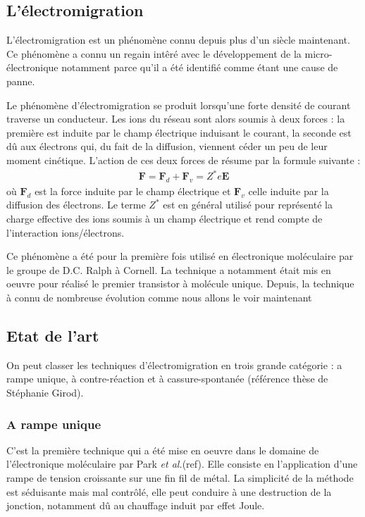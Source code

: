 \subsection{L'électromigration}
L'électromigration est un phénomène connu depuis plus d'un siècle maintenant. Ce phénomène a connu un regain int\^eré avec le développement de la micro-électronique notamment parce qu'il a été identifié comme étant une cause de panne.

Le phénomène d'électromigration se produit lorsqu'une forte densité de courant traverse un conducteur. Les ions du réseau sont alors soumis à deux forces : la première est induite par le champ électrique induisant le courant, la seconde est d\^u aux électrons qui, du fait de la diffusion, viennent céder un peu de leur moment cinétique. L'action de ces deux forces de résume par la formule suivante :
\begin{eqnarray}
\textbf{F} = \textbf{F}_d + \textbf{F}_v = Z^*e\textbf{E} \nonumber
\end{eqnarray}
où $\textbf{F}_d$ est la force induite par le champ électrique et $\textbf{F}_v$ celle induite par la diffusion des électrons. Le terme $Z^*$ est en général utilisé pour représenté la charge effective des ions soumis à un champ électrique et rend compte de l'interaction ions/électrons.

Ce phénomène a été pour la première fois utilisé en électronique moléculaire par le groupe de D.C. Ralph à Cornell. La technique a notamment était mis en oeuvre pour réalisé le premier transistor à molécule unique. Depuis, la technique à connu de nombreuse évolution comme nous allons le voir maintenant

\subsection{Etat de l'art}
On peut classer les techniques d'électromigration en trois grande catégorie : a rampe unique, à contre-réaction et à cassure-spontanée (référence thèse de Stéphanie Girod).

\subsubsection{A rampe unique}
C'est la première technique qui a été mise en oeuvre dans le domaine de l'électronique moléculaire par Park \textit{et al.}(ref). Elle consiste en l'application d'une rampe de tension croissante sur une fin fil de métal. La simplicité de la méthode est séduisante mais mal contrôlé, elle peut conduire à une destruction de la jonction, notamment dû au chauffage induit par effet Joule.

